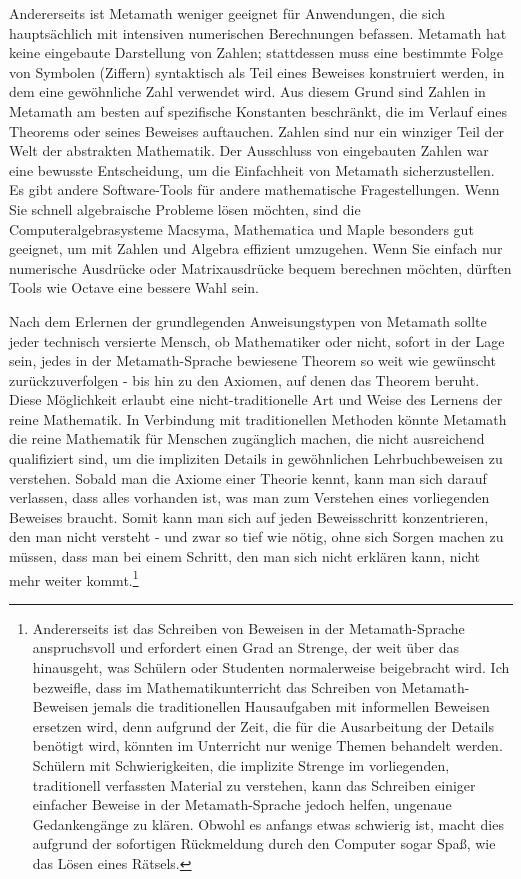 Andererseits ist Metamath weniger geeignet für Anwendungen, die sich hauptsächlich mit intensiven numerischen Berechnungen befassen.  Metamath hat keine eingebaute Darstellung von Zahlen; stattdessen muss eine bestimmte Folge von Symbolen (Ziffern) syntaktisch als Teil eines Beweises konstruiert werden, in dem eine gewöhnliche Zahl verwendet wird.  Aus diesem Grund sind Zahlen in Metamath am besten auf spezifische Konstanten beschränkt, die im Verlauf eines Theorems oder seines Beweises auftauchen.  Zahlen sind nur ein winziger Teil der Welt der abstrakten Mathematik.  Der Ausschluss von eingebauten Zahlen war eine bewusste Entscheidung, um die Einfachheit von Metamath sicherzustellen. Es gibt andere Software-Tools für andere mathematische Fragestellungen. Wenn Sie schnell algebraische Probleme lösen möchten, sind die Computeralgebrasysteme Macsyma, Mathematica und Maple besonders gut geeignet, um mit Zahlen und Algebra effizient umzugehen.  Wenn Sie einfach nur numerische Ausdrücke oder Matrixausdrücke bequem berechnen möchten, dürften Tools wie Octave eine bessere Wahl sein.

Nach dem Erlernen der grundlegenden Anweisungstypen von Metamath sollte jeder technisch versierte Mensch, ob Mathematiker oder nicht, sofort in der Lage sein, jedes in der Metamath-Sprache bewiesene Theorem so weit wie gewünscht zurückzuverfolgen - bis hin zu den Axiomen, auf denen das Theorem beruht.  Diese Möglichkeit erlaubt eine nicht-traditionelle Art und Weise des Lernens der reine Mathematik.  In Verbindung mit traditionellen Methoden könnte Metamath die reine Mathematik für Menschen zugänglich machen, die nicht ausreichend qualifiziert sind, um die impliziten Details in gewöhnlichen Lehrbuchbeweisen zu verstehen.  Sobald man die Axiome einer Theorie kennt, kann man sich darauf verlassen, dass alles vorhanden ist, was man zum Verstehen eines vorliegenden Beweises braucht.  Somit kann man sich auf jeden Beweisschritt konzentrieren, den man nicht versteht - und zwar so tief wie nötig, ohne sich Sorgen machen zu müssen, dass man bei einem Schritt, den man sich nicht erklären kann, nicht mehr weiter kommt.\footnote{Andererseits ist das Schreiben von Beweisen in der Metamath-Sprache anspruchsvoll und erfordert einen Grad an Strenge, der weit über das hinausgeht, was Schülern oder Studenten normalerweise beigebracht wird.  Ich bezweifle, dass im Mathematikunterricht das Schreiben von Metamath-Beweisen jemals die traditionellen Hausaufgaben mit informellen Beweisen ersetzen wird, denn aufgrund der Zeit, die für die Ausarbeitung der Details benötigt wird, könnten im Unterricht nur wenige Themen behandelt werden.  Schülern mit Schwierigkeiten, die implizite Strenge im vorliegenden, traditionell verfassten Material zu verstehen, kann das Schreiben einiger einfacher Beweise in der Metamath-Sprache jedoch helfen, ungenaue Gedankengänge zu klären.  Obwohl es anfangs etwas schwierig ist, macht dies aufgrund der sofortigen Rückmeldung durch den Computer sogar Spaß, wie das Lösen eines Rätsels.}

